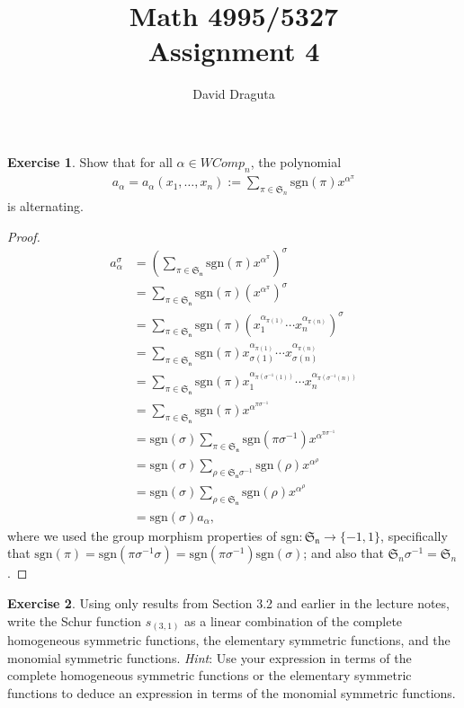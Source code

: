\documentclass[12pt]{extarticle}
\title{ Math 4995/5327
  \\
  Assignment 4}
\author{David Draguta}
\newcommand{\set}[1]{\{#1\}}
\newcommand{\sgn}{\text{sgn}}
\newcommand{\<}{\langle}
\renewcommand{\>}{\rangle}
\theoremstyle{definition}
\newtheorem{exercise}{Exercise}
\begin{document}
\maketitle

\begin{exercise}
  Show that for all $\alpha \in WComp_n$, the polynomial
  \begin{align*}
    a_{\alpha} = a_{\alpha}(x_1, \dots, x_n) := \sum\limits_{\pi \in \mathfrak{S}_n} \sgn(\pi) x^{\alpha^{\pi}}
  \end{align*}
  is alternating.
\end{exercise}
\begin{proof}
  \begin{align*}
    a_{\alpha}^{\sigma}
    &= (\sum\limits_{\pi \in \mathfrak{S_n}} \sgn(\pi) x^{\alpha^{\pi}})^{\sigma} \\ 
    &= \sum\limits_{\pi \in \mathfrak{S_n}} \sgn(\pi) (x^{\alpha^{\pi}})^{\sigma} \\
    &= \sum\limits_{\pi \in \mathfrak{S_n}} \sgn(\pi) (x_1^{\alpha_{\pi(1)}} \cdots x_n^{\alpha_{\pi(n)}})^{\sigma} \\
    &= \sum\limits_{\pi \in \mathfrak{S_n}} \sgn(\pi) x_{\sigma(1)}^{\alpha_{\pi(1)}} \cdots x_{\sigma(n)}^{\alpha_{\pi(n)}} \\
    &= \sum\limits_{\pi \in \mathfrak{S_n}} \sgn(\pi) x_{1}^{\alpha_{\pi(\sigma^{-1}(1))}} \cdots x_{n}^{\alpha_{\pi(\sigma^{-1}(n))}} \\
    &= \sum\limits_{\pi \in \mathfrak{S_n}} \sgn(\pi) x^{\alpha^{\pi\sigma^{-1}}} \\
    &= \sgn(\sigma)\sum\limits_{\pi \in \mathfrak{S_n}} \sgn(\pi\sigma^{-1}) x^{\alpha^{\pi\sigma^{-1}}} \\
    &= \sgn(\sigma)\sum\limits_{\rho \in \mathfrak{S_n}\sigma^{-1}} \sgn(\rho) x^{\alpha^{\rho}} \\
    &= \sgn(\sigma)\sum\limits_{\rho \in \mathfrak{S_n}} \sgn(\rho) x^{\alpha^{\rho}} \\
    &= \sgn(\sigma)a_{\alpha},
  \end{align*}
  where we used the group morphism properties of $\sgn: \mathfrak{S_n} \to \set{-1,1}$, specifically that
  $\sgn(\pi) = \sgn(\pi \sigma^{-1} \sigma) = \sgn(\pi \sigma^{-1}) \sgn(\sigma)$; and also that $\mathfrak{S}_n{\sigma^{-1}} = \mathfrak{S}_n$.
\end{proof}
\begin{exercise}
  Using only results from Section 3.2 and earlier in the lecture notes, write the Schur function $s_{(3,1)}$ as a linear combination of the complete homogeneous symmetric functions, the elementary symmetric functions, and the monomial symmetric functions. \emph{Hint}: Use your expression in terms of the complete homogeneous symmetric functions or the elementary symmetric functions to deduce an expression in terms of the monomial symmetric functions. 
\end{exercise}
\end{document}
